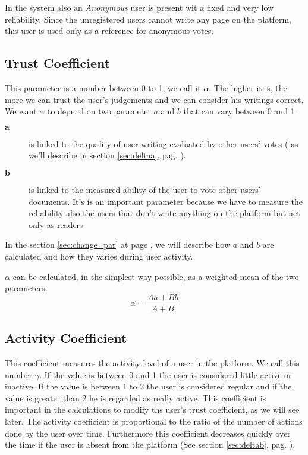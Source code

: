 \documentclass[a4paper,11pt]{article}
\begin{document}
In the system also an \emph{Anonymous} user is present wit a fixed and very low reliability. Since the unregistered users cannot write any page on the platform, this user is used only as a reference for anonymous votes. 

\subsection{Trust Coefficient}
This parameter is a number between 0 to 1, we call it $
\alpha$. The higher it is, the more we can trust the user's judgements and we can consider his writings correct. 
We want $\alpha$ to depend on two parameter $a$ and $b$ that can vary  between 0 
and 1.

\begin{description}
	\item[$\mathbf{a}$] is linked to the quality of user writing evaluated by other 
	users' votes ( as we'll describe in section \ref{sec:deltaa}, pag. \pageref{sec:deltaa}). 
	\item[$\mathbf{b}$] is linked to the measured ability of the user to vote other users' documents. It's is an important parameter because we have to measure the reliability also the users that don't write anything on the platform but act only as readers.
\end{description}
 
In the section \ref{sec:change_par} at page \pageref{sec:change_par}, we will describe how $a$ and $b$ are calculated and how they varies during user activity.

$\alpha$ can be calculated, in the simplest way possible, as a weighted mean of the two parameters:
\begin{equation}
\alpha = \frac{A a + B b}{A +B}
\end{equation} 

\subsection{Activity Coefficient}
This coefficient measures the activity level of a user in the platform. We call this number $\gamma$. If the value is 
between 0 and 1 the user is considered little active or inactive. If the value is between 
1 to 2 the user is considered regular and if the value is greater than 2 he is regarded as 
really active. This coefficient is important in the calculations to modify ths user's trust 
coefficient, as we will see later.
The activity coefficient is proportional to the ratio of the number of actions done by 
the user over time. Furthermore this coefficient decreases quickly over the time if the user is absent from the platform (See section \ref{sec:deltab}, pag. \pageref{sec:deltab}).
\end{document}
